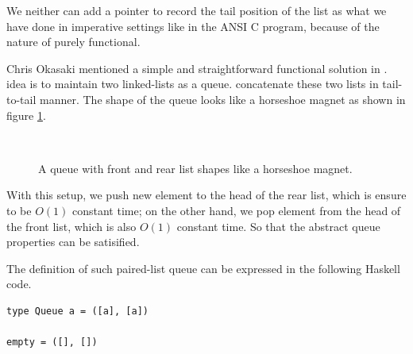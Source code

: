 \documentclass{article}
\begin{document}
We neither can add a pointer to record the tail position of the list
as what we have done in imperative settings like in the ANSI C program,
because of the nature of purely functional.

Chris Okasaki mentioned a simple and straightforward functional solution
in \cite{okasaki-book}. idea is to maintain two linked-lists as a queue. 
concatenate these two lists in tail-to-tail manner. The shape of the queue 
looks like a horseshoe magnet as shown in figure \ref{fig:horseshoe-magnet}.

\begin{figure}[htbp]
  \centering
   \\
  \caption{A queue with front and rear list shapes like a horseshoe magnet.} \label{fig:horseshoe-magnet}
\end{figure}

With this setup, we push new element to the head of the rear list, which is
ensure to be $O(1)$ constant time; on the other hand, we pop element from
the head of the front list, which is also $O(1)$ constant time.
So that the abstract queue properties can be satisified.

The definition of such paired-list queue can be expressed in the following
Haskell code.

\lstset{language=Haskell}
\begin{lstlisting}
type Queue a = ([a], [a])

empty = ([], [])
\end{lstlisting}
\end{document}
